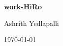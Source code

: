 {\Huge \textbf{work-HiRo}\par}
\vspace{1em}

{\large Ashrith Yedlapalli\par}
\vspace{0.5em}

{\normalsize \today\par}
